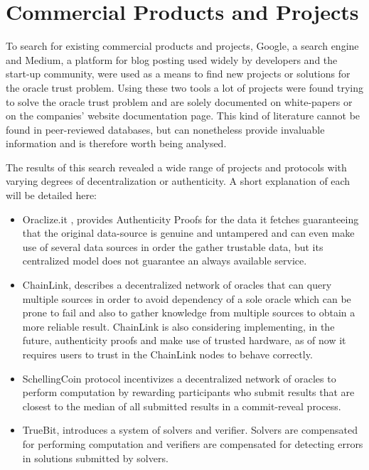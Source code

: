\begin{itemize}

\end{itemize}



\section{Commercial Products and Projects}


To search for existing commercial products and projects, Google, a search engine and Medium, a platform for blog posting used widely by developers and the start-up community, were used as a means to find new projects or solutions for the oracle trust problem. Using these two tools a lot of projects were found trying to solve the oracle trust problem and are solely documented on white-papers or on the companies' website documentation page. This kind of literature cannot be found in peer-reviewed databases, but can nonetheless provide invaluable information and is therefore worth being analysed.

The results of this search revealed a wide range of projects and protocols with varying degrees of decentralization or authenticity. A short explanation of each will be detailed here:

\begin{itemize}
  \item Oraclize.it \cite{Oraclize.it2018OraclizeDocumentation}, provides Authenticity Proofs for the data it fetches guaranteeing that the original data-source is genuine and untampered and can even make use of several data sources in order the gather trustable data, but its centralized model does not guarantee an always available service.
  \item ChainLink\cite{Ellis2017ChainLinkNetwork}, describes a decentralized network of oracles that can query multiple sources in order to avoid dependency of a sole oracle which can be prone to fail and also to gather knowledge from multiple sources to obtain a more reliable result. ChainLink is also considering implementing, in the future, authenticity proofs and make use of trusted hardware, as of now it requires users to trust in the ChainLink nodes to behave correctly.
  \item SchellingCoin protocol incentivizes a decentralized network of oracles
        to perform computation by rewarding participants who submit results
        that are closest to the median of all submitted results in a commit-reveal
        process.
  \item TrueBit, introduces a system of solvers and verifier. Solvers are
        compensated for performing computation and verifiers are compensated
        for detecting errors in solutions submitted by solvers.
\end{itemize}


